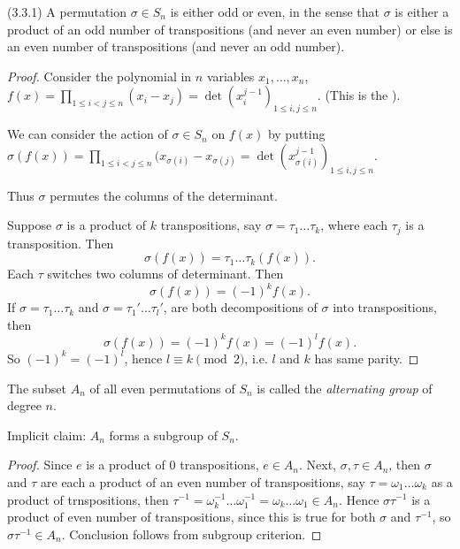 \begin{theorem}
	(3.3.1)
	A permutation $\sigma \in S_n$ is either odd or even, in the sense that $\sigma$ is either a product of an odd number of transpositions (and never an even number) or else is an even number of transpositions (and never an odd number).
\end{theorem}
\begin{proof}
	Consider the polynomial in $n$ variables $x_1, \ldots, x_n$, $f(x) = \prod_{1\le i<j\le n} (x_i - x_j) = \operatorname{det}(x_i^{j-1})_{1\le i,j\le n}  $. (This is the ). 

	We can consider the action of $\sigma \in S_n$ on $f(x)$ by putting $\sigma(f(x)) = \prod_{1\le i<j\le n} (x_{\sigma(i)}-x_{\sigma(j)} = \operatorname{det} \left( x_{\sigma(i)}^{j-1} \right) _{1\le i,j\le n}$.

	Thus $\sigma$ permutes the columns of the determinant.

	Suppose $\sigma$ is a product of $k$ transpositions, say $\sigma = \tau_1\ldots\tau_k$, where each $\tau_j$ is a transposition.
	Then \[
		\sigma(f(x)) = \tau_1\ldots\tau_k(f(x))
	.\] 
	Each $\tau$ switches two columns of determinant. Then
\[
		\sigma(f(x)) = (-1)^kf(x)
	.\]
	If $\sigma = \tau_1\ldots\tau_k$ and $\sigma = \tau_1'\ldots\tau_l'$, are both decompositions of $\sigma$ into transpositions, then \[
		\sigma(f(x)) = (-1)^k f(x) = (-1)^l f(x)
	.\] 
	So $(-1)^k = (-1)^l$, hence $l \equiv k \pmod 2$, i.e. $l$ and $k$ has same parity.
\end{proof}

\begin{definition}
	The subset $A_n$ of all even permutations of $S_n$ is called the \textit{alternating group} of degree $n$.
\end{definition}
Implicit claim: $A_n$ forms a subgroup of $S_n$.
\begin{proof}
	Since $e$ is a product of  $0$ transpositions, $e \in A_n$. Next, $\sigma, \tau \in A_n$, then $\sigma$ and $\tau$ are each a product of an even number of transpositions, say $\tau = \omega_1\ldots\omega_k$ as a product of trnspositions, then $\tau^{-1}  = \omega_k^{-1} \ldots\omega_1^{-1} = \omega_k \ldots\omega_1 \in A_n$. Hence $\sigma\tau^{-1}$ is a product of even number of transpositions, since this is true for both $\sigma$ and $\tau^{-1}$, so $\sigma\tau^{-1} \in A_n$. Conclusion follows from subgroup criterion.
\end{proof}



